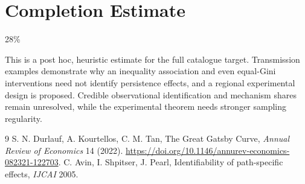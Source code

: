 \documentclass[11pt]{article}
\theoremstyle{definition}
\begin{document}
\section{Completion Estimate}
28\%

This is a post hoc, heuristic estimate for the full catalogue target.
Transmission examples demonstrate why an inequality association and even equal-Gini interventions need not identify persistence effects, and a regional experimental design is proposed. Credible observational identification and mechanism shares remain unresolved, while the experimental theorem needs stronger sampling regularity.

\begin{thebibliography}{9}
 S. N. Durlauf, A. Kourtellos, C. M. Tan, The Great Gatsby Curve, \emph{Annual Review of Economics} 14 (2022). \url{https://doi.org/10.1146/annurev-economics-082321-122703}.
 C. Avin, I. Shpitser, J. Pearl, Identifiability of path-specific effects, \emph{IJCAI} 2005.
\end{thebibliography}
\end{document}
